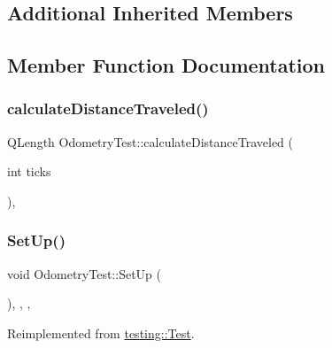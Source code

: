 \subsection*{Additional Inherited Members}


\subsection{Member Function Documentation}
\mbox{\label{classOdometryTest_afe7cb87c86a26db83f95b6a416a18510}} 
\subsubsection{\texorpdfstring{calculateDistanceTraveled()}{calculateDistanceTraveled()}}
{\footnotesize\ttfamily Q\+Length Odometry\+Test\+::calculate\+Distance\+Traveled (\begin{DoxyParamCaption}\item[{int}]{ticks }\end{DoxyParamCaption})\hspace{0.3cm}{\ttfamily [inline]}, {\ttfamily [protected]}}

\mbox{\label{classOdometryTest_a98fe68df1d22879a54cd343a01aaddf7}} 
\subsubsection{\texorpdfstring{SetUp()}{SetUp()}}
{\footnotesize\ttfamily void Odometry\+Test\+::\+Set\+Up (\begin{DoxyParamCaption}{ }\end{DoxyParamCaption})\hspace{0.3cm}{\ttfamily [inline]}, {\ttfamily [override]}, {\ttfamily [protected]}, {\ttfamily [virtual]}}



Reimplemented from \mbox{\hyperlink{classtesting_1_1Test_a190315150c303ddf801313fd1a777733}{testing\+::\+Test}}.

\mbox{\label{classOdometryTest_ab6bf7a06f46258b5953e59c2d813b243}} 
